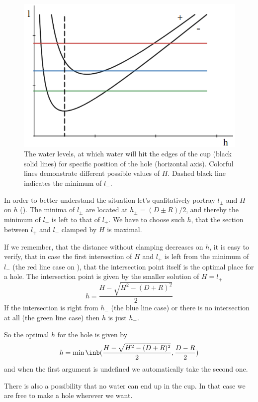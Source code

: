 \begin{figure}
    \centering
    \vspace{-.5cm}
    \includegraphics[width = .5\textwidth]{S-1}
    \caption{The water levels,
        at which water will hit the edges of the cup (black solid lines)
        for specific position of the hole (horizontal axis).
        Colorful lines demonstrate different possible values of $H$.
        Dashed black line indicates the minimum of $l_-$.}
    \vspace{-.5cm}
\end{figure}
In order to better understand the situation
let's qualitatively portray $l_\pm$ and $H$ on $h$ ().
The minima of $l_\pm$ are located at $h_\pm = (D \pm R) / 2$,
and thereby the minimum of $l_-$ is left to that of $l_+$.
We have to choose such $h$,
that the section between $l_+$ and $l_-$ clamped by $H$ is maximal.

If we remember, that the distance without clamping decreases on $h$,
it is easy to verify, that
in case the first intersection of $H$ and $l_+$
is left from the minimum of $l_-$ (the red line case on ),
that the intersection point itself is the optimal place for a hole.
The intersection point is given by the smaller solution of $H = l_+$
\begin{equation}
    h = \frac{H - \sqrt{H^2 - (D + R)^2}}{2}
\end{equation}
If the intersection is right from $h_-$ (the blue line case)
or there is no intersection at all (the green line case)
then $h$ is just $h_-$.

So the optimal $h$ for the hole is given by
\begin{equation}
    h = \min\inb({\frac{H - \sqrt{H^2 - (D + R)^2}}{2}, \frac{D-R}{2}})
\end{equation}
and when the first argument is undefined we automatically take the second one.

There is also a possibility that no water can end up in the cup.
In that case we are free to make a hole wherever we want.
